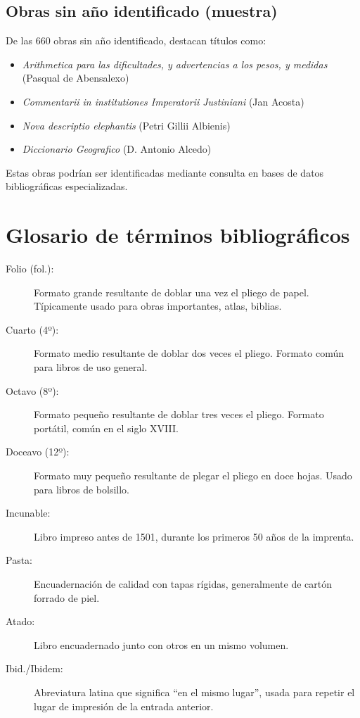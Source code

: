 \documentclass[12pt,a4paper]{article}
\begin{document}
\subsection{Obras sin año identificado (muestra)}

De las 660 obras sin año identificado, destacan títulos como:

\begin{itemize}
    \item \textit{Arithmetica para las dificultades, y advertencias a los pesos, y medidas} (Pasqual de Abensalexo)
    \item \textit{Commentarii in institutiones Imperatorii Justiniani} (Jan Acosta)
    \item \textit{Nova descriptio elephantis} (Petri Gillii Albienis)
    \item \textit{Diccionario Geografico} (D. Antonio Alcedo)
\end{itemize}

Estas obras podrían ser identificadas mediante consulta en bases de datos bibliográficas especializadas.

\section{Glosario de términos bibliográficos}

\begin{description}
    \item[Folio (fol.):] Formato grande resultante de doblar una vez el pliego de papel. Típicamente usado para obras importantes, atlas, biblias.

    \item[Cuarto (4º):] Formato medio resultante de doblar dos veces el pliego. Formato común para libros de uso general.

    \item[Octavo (8º):] Formato pequeño resultante de doblar tres veces el pliego. Formato portátil, común en el siglo XVIII.

    \item[Doceavo (12º):] Formato muy pequeño resultante de plegar el pliego en doce hojas. Usado para libros de bolsillo.

    \item[Incunable:] Libro impreso antes de 1501, durante los primeros 50 años de la imprenta.

    \item[Pasta:] Encuadernación de calidad con tapas rígidas, generalmente de cartón forrado de piel.

    \item[Atado:] Libro encuadernado junto con otros en un mismo volumen.

    \item[Ibid./Ibidem:] Abreviatura latina que significa ``en el mismo lugar'', usada para repetir el lugar de impresión de la entrada anterior.
\end{description}
\end{document}
